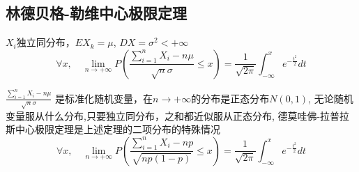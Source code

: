 \documentclass[10pt, a4paper]{article}
\begin{document}
    \subsection{林德贝格-勒维中心极限定理}
    $X_i$独立同分布，$EX_k = \mu$, $DX = \sigma^2 < +\infty$
    $$\forall x, \quad \lim_{n\rightarrow+\infty}P(\frac{\sum_{i = 1}^nX_i - n\mu}{\sqrt{n}\sigma} \leqslant x) = \frac{1}{\sqrt{2\pi}}\int_{-\infty}^x e^{-\frac{t^2}{2}}dt  $$

    $\frac{\sum_{i = 1}^nX_i - n\mu}{\sqrt{n}\sigma}$ 是标准化随机变量，在$n\rightarrow+\infty$的分布是正态分布$N(0, 1)$, 无论随机变量服从什么分布,只要独立同分布，之和都近似服从正态分布, 德莫哇佛-拉普拉斯中心极限定理是上述定理的二项分布的特殊情况
    $$\forall x, \quad \lim_{n\rightarrow+\infty}P(\frac{\sum_{i = 1}^nX_i - np}{\sqrt{np(1-p)}} \leqslant x) = \frac{1}{\sqrt{2\pi}}\int_{-\infty}^x e^{-\frac{t^2}{2}}dt  $$
    
\end{document}
